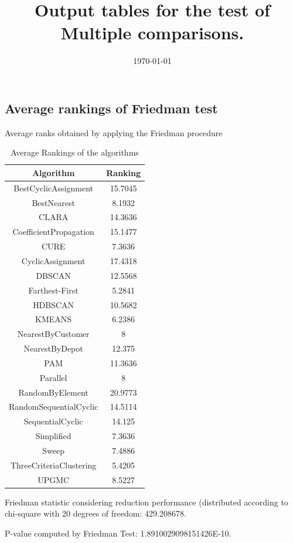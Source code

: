 \documentclass[a4paper,10pt]{article}
\title{Output tables for the test of Multiple comparisons.}
\author{}
\date{\today}
\begin{document}
\begin{landscape}
\pagestyle{empty}
\maketitle
\thispagestyle{empty}
\section{Average rankings of Friedman test}



Average ranks obtained by applying the Friedman procedure

\begin{table}[!htp]
\centering
\begin{tabular}{|c|c|}\hline
Algorithm&Ranking\\\hline
BestCyclicAssignment & 15.7045\\
BestNearest & 8.1932\\
CLARA & 14.3636\\
CoefficientPropagation & 15.1477\\
CURE & 7.3636\\
CyclicAssignment & 17.4318\\
DBSCAN & 12.5568\\
Farthest-First & 5.2841\\
HDBSCAN & 10.5682\\
KMEANS & 6.2386\\
NearestByCustomer & 8\\
NearestByDepot & 12.375\\
PAM & 11.3636\\
Parallel & 8\\
RandomByElement & 20.9773\\
RandomSequentialCyclic & 14.5114\\
SequentialCyclic & 14.125\\
Simplified & 7.3636\\
Sweep & 7.4886\\
ThreeCriteriaClustering & 5.4205\\
UPGMC & 8.5227\\
\hline
\end{tabular}
\caption{Average Rankings of the algorithms}
\end{table}

Friedman statistic considering reduction performance (distributed according to chi-square with 20 degrees of freedom: 429.208678.

P-value computed by Friedman Test: 1.8910029098151426E-10.\newline


\end{landscape}
\end{document}
